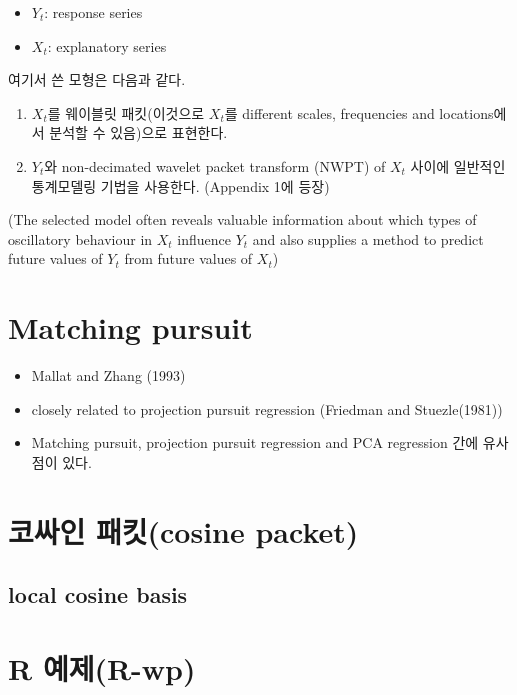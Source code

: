 \documentclass[b5paper,]{scrbook}
\theoremstyle{plain}
\theoremstyle{definition}
\numberwithin{equation}{section}
\begin{document}
\begin{itemize}
\item
  \(Y_{t}\): response series
\item
  \(X_{t}\): explanatory series
\end{itemize}

여기서 쓴 모형은 다음과 같다.

\begin{enumerate}
\def\labelenumi{\arabic{enumi}.}
\item
  \(X_{t}\)를 웨이블릿 패킷(이것으로 \(X_{t}\)를 different scales,
  frequencies and locations에서 분석할 수 있음)으로 표현한다.
\item
  \(Y_{t}\)와 non-decimated wavelet packet transform (NWPT) of \(X_{t}\)
  사이에 일반적인 통계모델링 기법을 사용한다. (Appendix 1에 등장)
\end{enumerate}

(The selected model often reveals valuable information about which types
of oscillatory behaviour in \(X_{t}\) influence \(Y_{t}\) and also
supplies a method to predict future values of \(Y_{t}\) from future
values of \(X_{t}\))

\section{Matching pursuit}\label{matching-pursuit}

\begin{itemize}
\item
  Mallat and Zhang (1993)
\item
  closely related to projection pursuit regression (Friedman and
  Stuezle(1981))
\item
  Matching pursuit, projection pursuit regression and PCA regression
  간에 유사점이 있다.
\end{itemize}

\section{코싸인 패킷(cosine packet)}\label{-cosine-packet}

\subsection{local cosine basis}\label{local-cosine-basis}

\section{R 예제(R-wp)}\label{r-r-wp}
\end{document}
